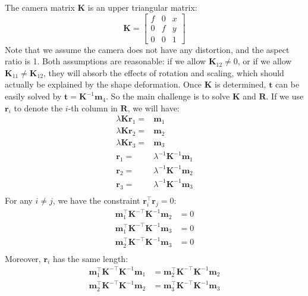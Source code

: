 \documentclass[10pt,twocolumn,letterpaper]{article}
\begin{document}
The camera matrix $\mathbf{K}$ is an upper triangular matrix:
\begin{equation}
\mathbf{K}=\left [
\begin{array}{ccc}
f & 0 & x \\
0 & f & y \\
0 & 0 & 1
\end{array}
\right ]
\end{equation}
Note that we assume the camera does not have any distortion, and the aspect ratio is 1. Both assumptions are reasonable: if we allow $\mathbf{K}_{12}\neq 0$, or if we allow $\mathbf{K}_{11}\neq\mathbf{K}_{12}$, they will absorb the effects of rotation and scaling, which should actually be explained by the shape deformation. Once $\mathbf{K}$ is determined, $\mathbf{t}$ can be easily solved by $\mathbf{t} = \mathbf{K}^{-1}\mathbf{m}_4$. So the main challenge is to solve $\mathbf{K}$ and $\mathbf{R}$. If we use $\mathbf{r}_i$ to denote the $i$-th column in $\mathbf{R}$, we will have:
\begin{equation}
\begin{split}
\lambda\mathbf{K}\mathbf{r}_1=&\mathbf{m}_1\\
\lambda\mathbf{K}\mathbf{r}_2=&\mathbf{m}_2\\
\lambda\mathbf{K}\mathbf{r}_3=&\mathbf{m}_3\\
\mathbf{r}_1=&\lambda^{-1}\mathbf{K}^{-1}\mathbf{m}_1\\
\mathbf{r}_2=&\lambda^{-1}\mathbf{K}^{-1}\mathbf{m}_2\\
\mathbf{r}_3=&\lambda^{-1}\mathbf{K}^{-1}\mathbf{m}_3\\
\end{split}
\end{equation}
For any $i\neq j$, we have the constraint $\mathbf{r}_i^\top\mathbf{r}_j=0$:
\begin{equation}
\begin{split}
\mathbf{m}_1^\top\mathbf{K}^{-\top}\mathbf{K}^{-1}\mathbf{m}_2&=0\\
\mathbf{m}_1^\top\mathbf{K}^{-\top}\mathbf{K}^{-1}\mathbf{m}_3&=0\\
\mathbf{m}_2^\top\mathbf{K}^{-\top}\mathbf{K}^{-1}\mathbf{m}_3&=0\\
\end{split}
\end{equation}
Moreover, $\mathbf{r}_i$ has the same length:
\begin{equation}
\begin{split}
\mathbf{m}_1^\top\mathbf{K}^{-\top}\mathbf{K}^{-1}\mathbf{m}_1&=\mathbf{m}_2^\top\mathbf{K}^{-\top}\mathbf{K}^{-1}\mathbf{m}_2\\
\mathbf{m}_2^\top\mathbf{K}^{-\top}\mathbf{K}^{-1}\mathbf{m}_2&=\mathbf{m}_3^\top\mathbf{K}^{-\top}\mathbf{K}^{-1}\mathbf{m}_3\\
\end{split}
\end{equation}
\end{document}
